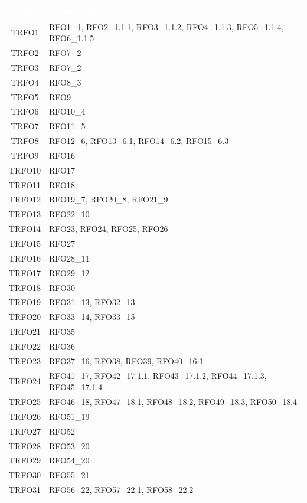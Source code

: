 \begin{longtable}{|c| C{13cm}|}
	\textcolor{white}{\textbf{ID Test}}&
	\textcolor{white}{\textbf{ID Requisito}}\label{tab:TestSistema2}\\
	TRFO1 & RFO1\_1, RFO2\_1.1.1, RFO3\_1.1.2, RFO4\_1.1.3, RFO5\_1.1.4, RFO6\_1.1.5\\ \hline
	TRFO2 & RFO7\_2\\ \hline
	TRFO3 & RFO7\_2\\ \hline
	TRFO4 & RFO8\_3\\ \hline
	TRFO5 & RFO9\\ \hline
	TRFO6 & RFO10\_4\\ \hline
	TRFO7 & RFO11\_5\\ \hline
	TRFO8 & RFO12\_6, RFO13\_6.1, RFO14\_6.2, RFO15\_6.3\\ \hline
	TRFO9 & RFO16\\ \hline
	TRFO10 & RFO17\\ \hline
	TRFO11 & RFO18\\ \hline
	TRFO12 & RFO19\_7, RFO20\_8, RFO21\_9\\ \hline
	TRFO13 & RFO22\_10\\ \hline
	TRFO14 & RFO23, RFO24, RFO25, RFO26\\ \hline
	TRFO15 & RFO27\\ \hline
	TRFO16 & RFO28\_11\\ \hline
	TRFO17 & RFO29\_12\\ \hline
	TRFO18 & RFO30\\ \hline
	TRFO19 & RFO31\_13, RFO32\_13\\ \hline
	TRFO20 & RFO33\_14, RFO33\_15\\ \hline
	TRFO21 & RFO35\\ \hline
	TRFO22 & RFO36\\ \hline
	TRFO23 & RFO37\_16, RFO38, RFO39, RFO40\_16.1\\ \hline
	TRFO24 & RFO41\_17, RFO42\_17.1.1, RFO43\_17.1.2, RFO44\_17.1.3, RFO45\_17.1.4\\ \hline
	TRFO25 & RFO46\_18, RFO47\_18.1, RFO48\_18.2, RFO49\_18.3, RFO50\_18.4\\ \hline
	TRFO26 & RFO51\_19\\ \hline
	TRFO27 & RFO52\\ \hline
	TRFO28 & RFO53\_20\\ \hline
	TRFO29 & RFO54\_20\\ \hline
	TRFO30 & RFO55\_21\\ \hline
	TRFO31 & RFO56\_22, RFO57\_22.1, RFO58\_22.2\\ \hline

\end{longtable}
